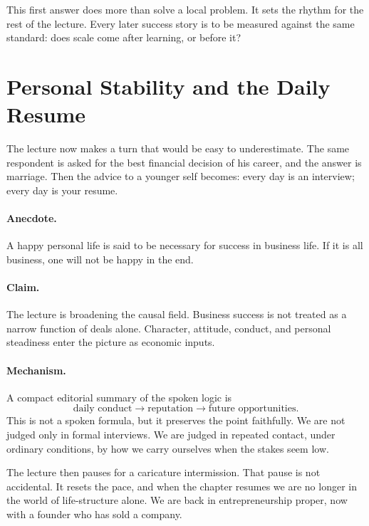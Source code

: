 This first answer does more than solve a local problem. It sets the rhythm for the rest of the lecture. Every later success story is to be measured against the same standard: does scale come after learning, or before it?

\section{Personal Stability and the Daily Resume}

The lecture now makes a turn that would be easy to underestimate. The same respondent is asked for the best financial decision of his career, and the answer is marriage. Then the advice to a younger self becomes: every day is an interview; every day is your resume.

\paragraph{Anecdote.}
A happy personal life is said to be necessary for success in business life. If it is all business, one will not be happy in the end.

\paragraph{Claim.}
The lecture is broadening the causal field. Business success is not treated as a narrow function of deals alone. Character, attitude, conduct, and personal steadiness enter the picture as economic inputs.

\paragraph{Mechanism.}
A compact editorial summary of the spoken logic is
\begin{equation}
\text{daily conduct}
\longrightarrow
\text{reputation}
\longrightarrow
\text{future opportunities}.
\end{equation}
This is not a spoken formula, but it preserves the point faithfully. We are not judged only in formal interviews. We are judged in repeated contact, under ordinary conditions, by how we carry ourselves when the stakes seem low.

The lecture then pauses for a caricature intermission. That pause is not accidental. It resets the pace, and when the chapter resumes we are no longer in the world of life-structure alone. We are back in entrepreneurship proper, now with a founder who has sold a company.

